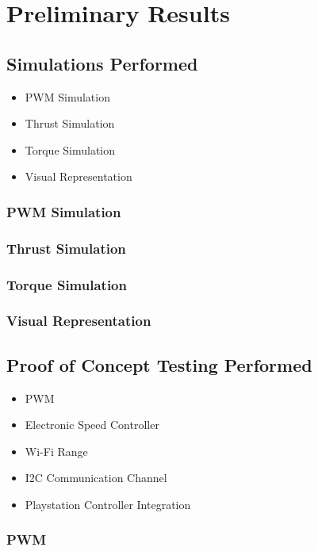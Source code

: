 \section{Preliminary Results}
\subsection{Simulations Performed}
\begin{itemize}
  \item{PWM Simulation}
  \item{Thrust Simulation}
  \item{Torque Simulation}
  \item{Visual Representation}
 \end{itemize}
  
\subsubsection{PWM Simulation}

\subsubsection{Thrust Simulation}

\subsubsection{Torque Simulation}

\subsubsection{Visual Representation}

  
\subsection{Proof of Concept Testing Performed}
\begin{itemize}
  \item{PWM}
  \item{Electronic Speed Controller}
  \item{Wi-Fi Range}
  \item{I2C Communication Channel}
  \item{Playstation Controller Integration}
 \end{itemize}
  
  \subsubsection{PWM}
  
